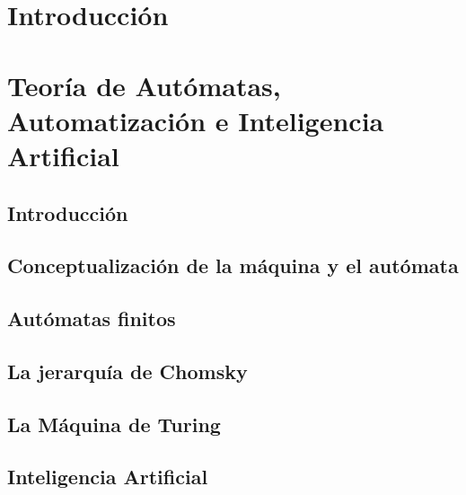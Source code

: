 \documentclass[a4paper,11pt]{article}
\begin{document}
\tableofcontents

\newpage

\section{Introducción}


\newpage


\section{Teoría de Autómatas, Automatización e Inteligencia Artificial}

\subsection{Introducción}


\subsection{Conceptualización de la máquina y el autómata}


\subsection{Autómatas finitos}


\subsection{La jerarquía de Chomsky}


\subsection{La Máquina de Turing}


\subsection{Inteligencia Artificial}

\end{document}
